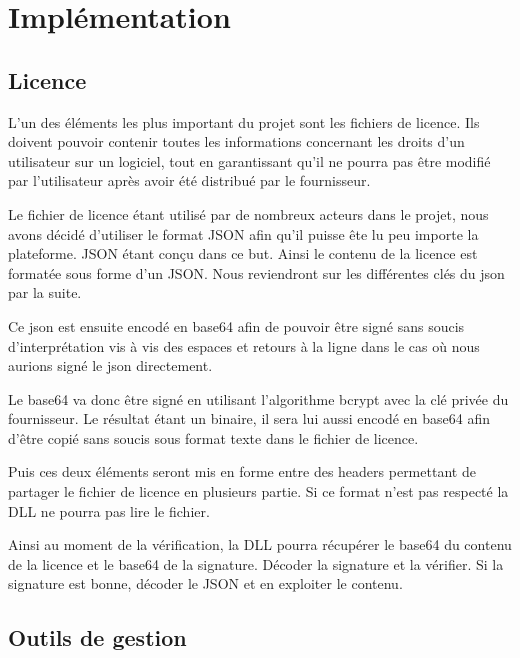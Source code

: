 \chapter{Implémentation}



\section{Licence}

L'un des éléments les plus important du projet sont les fichiers de licence. \newline
Ils doivent pouvoir contenir toutes les informations concernant les droits d'un
utilisateur sur un logiciel, tout en garantissant qu'il ne pourra pas être 
modifié par l'utilisateur après avoir été distribué par le fournisseur.
\newline

Le fichier de licence étant utilisé par de nombreux acteurs dans le projet, 
nous avons décidé d'utiliser le format JSON afin qu'il puisse ête lu peu importe
la plateforme. JSON étant conçu dans ce but.
Ainsi le contenu de la licence est formatée sous forme d'un JSON. Nous reviendront
sur les différentes clés du json par la suite.
\newline

Ce json est ensuite encodé en base64 afin de pouvoir être signé sans soucis 
d'interprétation vis à vis des espaces et retours à la ligne dans le cas où nous 
aurions signé le json directement.
\newline

Le base64 va donc être signé en utilisant l'algorithme bcrypt avec la clé privée 
du fournisseur. Le résultat étant un binaire, il sera lui aussi encodé en base64 
afin d'être copié sans soucis sous format texte dans le fichier de licence. 
\newline

Puis ces deux éléments seront mis en forme entre des headers permettant de 
partager le fichier de licence en plusieurs partie. Si ce format n'est pas 
respecté la DLL ne pourra pas lire le fichier.
\newline

Ainsi au moment de la vérification, la DLL pourra récupérer le base64 du contenu 
de la licence et le base64 de la signature. Décoder la signature et la vérifier.
Si la signature est bonne, décoder le JSON et en exploiter le contenu.

\section{Outils de gestion}

